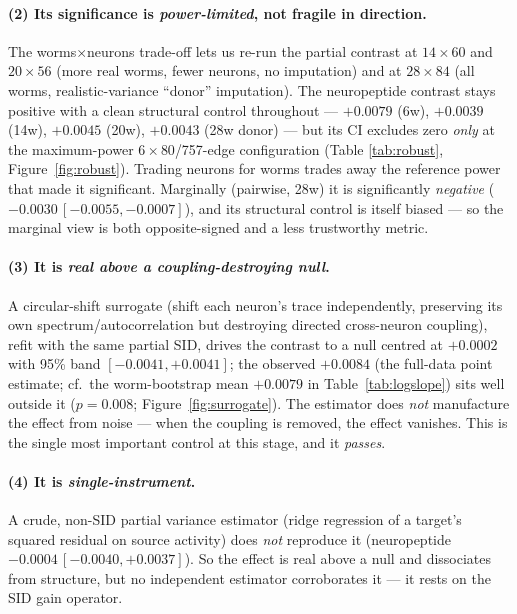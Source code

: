 \documentclass[11pt]{article}
\begin{document}
\paragraph{(2) Its significance is \emph{power-limited}, not fragile in direction.} The
worms$\times$neurons trade-off lets us re-run the partial contrast at $14\times60$ and $20\times56$
(more real worms, fewer neurons, no imputation) and at $28\times84$ (all worms, realistic-variance
``donor'' imputation). The neuropeptide contrast stays positive with a clean structural control
throughout --- $+0.0079$ (6w), $+0.0039$ (14w), $+0.0045$ (20w), $+0.0043$ (28w donor) --- but its
CI excludes zero \emph{only} at the maximum-power $6\times80$/757-edge configuration (Table
\ref{tab:robust}, Figure~\ref{fig:robust}). Trading neurons for worms trades away the reference power
that made it significant. Marginally (pairwise, 28w) it is significantly \emph{negative}
($-0.0030\,[-0.0055,-0.0007]$), and its structural control is itself biased --- so the marginal view
is both opposite-signed and a less trustworthy metric.

\paragraph{(3) It is \emph{real above a coupling-destroying null}.} A circular-shift surrogate
(shift each neuron's trace independently, preserving its own spectrum/autocorrelation but destroying
directed cross-neuron coupling), refit with the same partial SID, drives the contrast to a null
centred at $+0.0002$ with 95\% band $[-0.0041,+0.0041]$; the observed $+0.0084$ (the full-data point estimate; cf.\ the worm-bootstrap mean $+0.0079$ in Table~\ref{tab:logslope}) sits well outside it
($p=0.008$; Figure~\ref{fig:surrogate}). The estimator does \emph{not} manufacture the effect from
noise --- when the coupling is removed, the effect vanishes. This is the single most important
control at this stage, and it \emph{passes}.

\paragraph{(4) It is \emph{single-instrument}.} A crude, non-SID partial variance estimator (ridge
regression of a target's squared residual on source activity) does \emph{not} reproduce it
(neuropeptide $-0.0004\,[-0.0040,+0.0037]$). So the effect is real above a null and dissociates from
structure, but no independent estimator corroborates it --- it rests on the SID gain operator.
\end{document}
